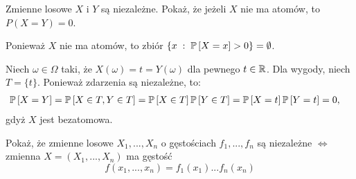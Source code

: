 \documentclass{article}
\begin{document}
\begin{problem}[5]{}
Zmienne losowe $X$ i $Y$ są niezależne. Pokaż, że jeżeli $X$ nie ma atomów, to $P(X=Y)=0$.
\end{problem}

Ponieważ $X$ nie ma atomów, to zbiór $\{x\;:\;\prob{X=x}>0\}=\emptyset$.

Niech $\omega\in\Omega$ taki, że $X(\omega)=t=Y(\omega)$ dla pewnego $t\in\mathbb{R}$. Dla wygody, niech $T=\{t\}$. Ponieważ zdarzenia są niezależne, to:
\begin{align*}
    \prob{X=Y}&=\prob{X\in T, Y\in T}=\prob{X\in T}\prob{Y\in T}=\prob{X=t}\prob{Y=t}=0,
\end{align*}
gdyż $X$ jest bezatomowa.

\begin{problem}[7]
Pokaż, że zmienne losowe $X_1,...,X_n$ o gęstościach $f_1,...,f_n$ są niezależne $\iff$ zmienna $X=(X_1,...,X_n)$ ma gęstość
$$f(x_1,...,x_n)=f_1(x_1)...f_n(x_n)$$
\end{problem}
\end{document}
